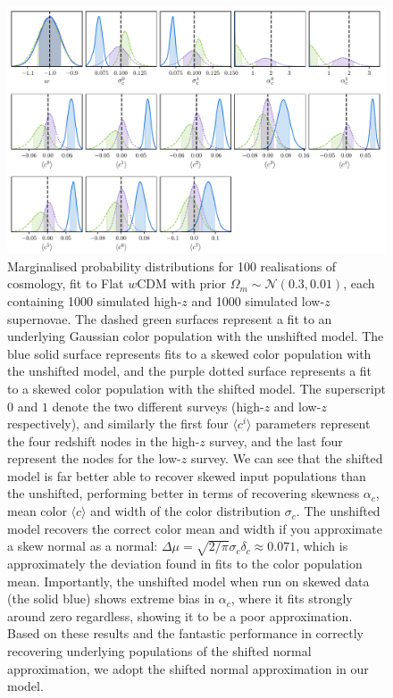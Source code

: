 \documentclass[a4paper,fleqn,usenatbib]{mnras}
\begin{document}
\begin{figure}
	\begin{center}
		\includegraphics[width=\textwidth]{simple_w_shift_dist_0.pdf}
	\end{center}
	\caption{Marginalised probability distributions for 100 realisations of cosmology, fit to Flat $w$CDM with prior $\Omega_m \sim \mathcal{N}(0.3, 0.01)$, each containing 1000 simulated high-$z$ and 1000 simulated low-$z$ supernovae. The dashed green surfaces represent a fit to an underlying Gaussian color population with the unshifted model. The blue solid surface represents fits to a skewed color population with the unshifted model, and the purple dotted surface represents a fit to a skewed color population with the shifted model. The superscript $0$ and $1$ denote the two different surveys (high-$z$ and low-$z$ respectively), and similarly the first four $\langle c^i \rangle$ parameters represent the four redshift nodes in the high-$z$ survey, and the last four represent the nodes for the low-$z$ survey. We can see that the shifted model is far better able to recover skewed input populations than the unshifted, performing better in terms of recovering skewness $\alpha_c$, mean color $\langle c \rangle$ and width of the color distribution $\sigma_c$. The unshifted model recovers the correct color mean and width if you approximate a skew normal as a normal: $\Delta\mu = \sqrt{2/\pi}\sigma_c\delta_c \approx 0.071$, which is approximately the deviation found in fits to the color population mean. Importantly, the unshifted model when run on skewed data (the solid blue) shows extreme bias in $\alpha_c$, where it fits strongly around zero regardless, showing it to be a poor approximation. Based on these results and the fantastic performance in correctly recovering underlying populations of the shifted normal approximation, we adopt the shifted normal approximation in our model.}
	\label{fig:simple_w_super}
\end{figure}
\end{document}
